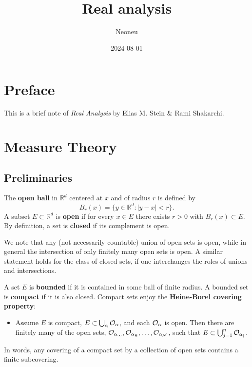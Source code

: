 \documentclass[
]{book}
\title{Real analysis}
\author{Neoneu}
\date{2024-08-01}
\providecommand{\tightlist}{%
  \setlength{\itemsep}{0pt}\setlength{\parskip}{0pt}}
\theoremstyle{definition}
\theoremstyle{definition}
\theoremstyle{definition}
\theoremstyle{definition}
\theoremstyle{remark}
\begin{document}
\maketitle

{
\setcounter{tocdepth}{1}
\tableofcontents
}
\chapter*{Preface}\label{preface}

This is a brief note of \emph{Real Analysis} by Elias M. Stein \& Rami Shakarchi.

\chapter{Measure Theory}\label{ch1}

\section{Preliminaries}\label{preliminaries}

The \textbf{open ball} in \(\mathbb{R}^d\) centered at \(x\) and of radius \(r\) is defined by
\[
B_r(x)=\{y\in \mathbb{R}^d :|y−x|<r\}.
\]
A subset \(E\subset\mathbb{R}^d\) is \textbf{open} if for every \(x\in E\) there exists \(r>0\) with \(B_r(x)\subset E\). By definition, a set is \textbf{closed} if its complement is open.

We note that any (not necessarily countable) union of open sets is open, while in general the intersection of only finitely many open sets is open. A similar statement holds for the class of closed sets, if one interchanges the roles of unions and intersections.

A set \(E\) is \textbf{bounded} if it is contained in some ball of finite radius. A bounded set is \textbf{compact} if it is also closed. Compact sets enjoy the \textbf{Heine-Borel covering property}:

\begin{itemize}
\tightlist
\item
  Assume \(E\) is compact, \(E\subset \bigcup_{\alpha}\cal{O}_{\alpha}\), and each \(\cal{O}_{\alpha}\) is open. Then there are finitely many of the open sets, \(\cal{O}_{\alpha_1},{O}_{\alpha_2},\dots,{O}_{\alpha_N}\), such that \(E\subset \bigcup_{j=1}^n\cal{O}_{\alpha_j}\).
\end{itemize}

In words, any covering of a compact set by a collection of open sets contains a finite subcovering.
\end{document}
